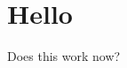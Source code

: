 \documentclass{article}
\begin{document}
\section{Hello}

\label{sec:hello}

Does this work now?
\end{document}
